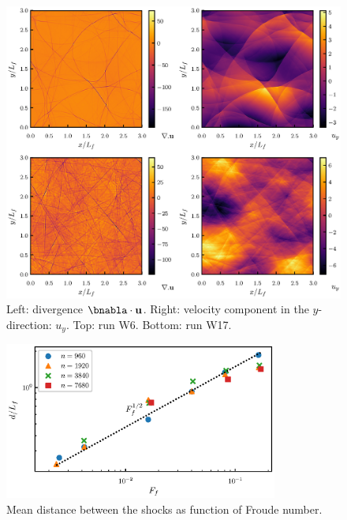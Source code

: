 \begin{figure}
\centerline{\includegraphics[]{paper_04_shallow_water/Pyfig/fig5}}
\caption{Left: divergence $ \bnabla \cdot {\bf u} $. Right: velocity component in the $ y $-direction: $ u_y $. Top: run W6. Bottom: run W17.  }
\label{Physical}
\end{figure}

\begin{figure}
\centerline{\includegraphics[width=9cm]{paper_04_shallow_water/Pyfig/fig6}}
\caption{Mean distance between the shocks as function of Froude number.  }
\label{fig_distance}
\end{figure}




